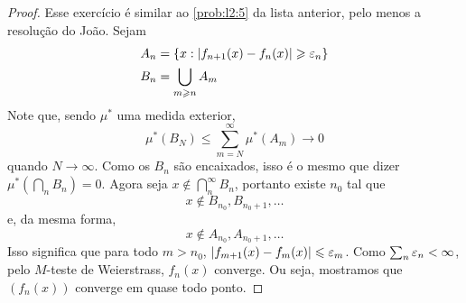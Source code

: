 \begin{problem}
    \label{prob:l3:3}
\end{problem}
\begin{proof}
    Esse exercício é similar ao \ref{prob:l2:5} da lista anterior, pelo menos a resolução do João. Sejam 
    \begin{align*}
        A_n &= \{x : |f_{n+1}(x) - f_n(x)| \geqslant \varepsilon_n\}\\
        B_n &= \bigcup_{m \geqslant n} A_m
    \end{align*}
    Note que, sendo $\mu^*$ uma medida exterior,
    $$\mu^*(B_N) \leq \sum_{m = N}^{\infty} \mu^*(A_m) \to 0$$
    quando $N \to \infty$. Como os $B_n$ são encaixados, isso é o mesmo que dizer $\mu^*(\bigcap_n B_n) = 0$.
    Agora seja $x \not \in \bigcap_n^\infty B_n$, portanto existe $n_0$ tal que 
    $$ x \not \in B_{n_0}, B_{n_0 + 1}, \dots $$
    e, da mesma forma, 
    $$ x \not \in A_{n_0}, A_{n_0 + 1}, \dots$$
    Isso significa que para todo $m > n_0$, $|f_{m+1}(x) - f_{m}(x)| \leqslant \varepsilon_m$. Como
    $\sum_n \varepsilon_n < \infty$, pelo $M$-teste de Weierstrass, $f_n(x)$ converge. Ou seja, mostramos 
    que $(f_n(x))$ converge em quase todo ponto.
\end{proof}



\begin{problem}
    \label{prob:l3:4}
\end{problem}


